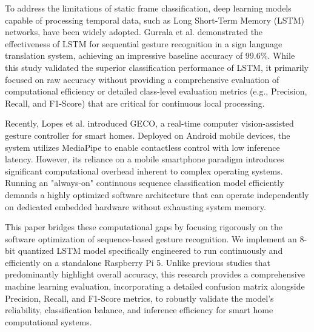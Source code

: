 To address the limitations of static frame classification, deep learning models capable of processing temporal data, such as Long Short-Term Memory (LSTM) networks, have been widely adopted. Gurrala et al. \cite{gurrala2025lstm} demonstrated the effectiveness of LSTM for sequential gesture recognition in a sign language translation system, achieving an impressive baseline accuracy of 99.6\%. While this study validated the superior classification performance of LSTM, it primarily focused on raw accuracy without providing a comprehensive evaluation of computational efficiency or detailed class-level evaluation metrics (e.g., Precision, Recall, and F1-Score) that are critical for continuous local processing.

Recently, Lopes et al. \cite{lopes2026geco} introduced GECO, a real-time computer vision-assisted gesture controller for smart homes. Deployed on Android mobile devices, the system utilizes MediaPipe to enable contactless control with low inference latency. However, its reliance on a mobile smartphone paradigm introduces significant computational overhead inherent to complex operating systems. Running an "always-on" continuous sequence classification model efficiently demands a highly optimized software architecture that can operate independently on dedicated embedded hardware without exhausting system memory. 

This paper bridges these computational gaps by focusing rigorously on the software optimization of sequence-based gesture recognition. We implement an 8-bit quantized LSTM model specifically engineered to run continuously and efficiently on a standalone Raspberry Pi 5. Unlike previous studies that predominantly highlight overall accuracy, this research provides a comprehensive machine learning evaluation, incorporating a detailed confusion matrix alongside Precision, Recall, and F1-Score metrics, to robustly validate the model's reliability, classification balance, and inference efficiency for smart home computational systems.


